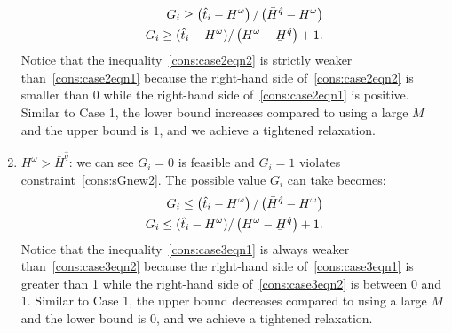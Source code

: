 \documentclass[11pt]{article}
\renewcommand{\underbar}{\underaccent{\bar}}
\begin{document}
\begin{enumerate}
			\begin{subequations}
				\begin{align}
				G_i \geq \left(\hat{t}_i - H^\omega \right)/\left( \bar{H}^{\hat{q}} - H^\omega \right) \label{cons:case2eqn1}\\
				G_i \geq (\hat{t}_i - H^\omega)/\left(H^\omega - \underbar{H}^{\hat{q}} \right) + 1. \label{cons:case2eqn2}
				\end{align}
			\end{subequations}
			Notice that the inequality~\eqref{cons:case2eqn2} is strictly weaker than~\eqref{cons:case2eqn1} because the right-hand side of~\eqref{cons:case2eqn2} is smaller than 0 while the right-hand side of~\eqref{cons:case2eqn1} is positive. Similar to Case 1, the lower bound increases compared to using a large \(M\) and the upper bound is \(1\), and we achieve a tightened relaxation.
		\item 
			\(H^\omega > \bar{H}^{\hat{q}}\): 
			we can see \(G_i = 0\) is feasible and \(G_i = 1\) violates constraint~\eqref{cons:sGnew2}. The possible value \(G_i\) can take becomes:
			\begin{subequations}
				\begin{align}
				G_i \leq \left(\hat{t}_i - H^\omega \right)/\left( \bar{H}^{\hat{q}} - H^\omega \right) \label{cons:case3eqn1}\\
				G_i \leq (\hat{t}_i - H^\omega)/\left(H^\omega - \underbar{H}^{\hat{q}} \right) + 1. \label{cons:case3eqn2}
				\end{align}
			\end{subequations}
			Notice that the inequality~\eqref{cons:case3eqn1} is always weaker than~\eqref{cons:case3eqn2} because the right-hand side of~\eqref{cons:case3eqn1} is greater than 1 while the right-hand side of~\eqref{cons:case3eqn2} is between 0 and 1. Similar to Case 1, the upper bound decreases compared to using a large \(M\) and the lower bound is \(0\), and we achieve a tightened relaxation.
	\end{enumerate}
\end{document}
